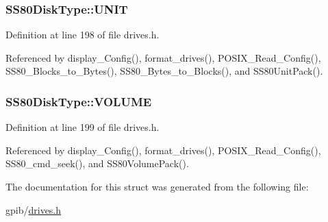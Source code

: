 \subsubsection[{\texorpdfstring{U\+N\+IT}{UNIT}}]{ S\+S80\+Disk\+Type\+::\+U\+N\+IT}\hypertarget{structSS80DiskType_ac630da1440afd60d726c7c41eb7b990c}{}\label{structSS80DiskType_ac630da1440afd60d726c7c41eb7b990c}


Definition at line 198 of file drives.\+h.



Referenced by display\+\_\+\+Config(), format\+\_\+drives(), P\+O\+S\+I\+X\+\_\+\+Read\+\_\+\+Config(), S\+S80\+\_\+\+Blocks\+\_\+to\+\_\+\+Bytes(), S\+S80\+\_\+\+Bytes\+\_\+to\+\_\+\+Blocks(), and S\+S80\+Unit\+Pack().

\subsubsection[{\texorpdfstring{V\+O\+L\+U\+ME}{VOLUME}}]{ S\+S80\+Disk\+Type\+::\+V\+O\+L\+U\+ME}\hypertarget{structSS80DiskType_adef69576dbc48a5d70ff628578d77b60}{}\label{structSS80DiskType_adef69576dbc48a5d70ff628578d77b60}


Definition at line 199 of file drives.\+h.



Referenced by display\+\_\+\+Config(), format\+\_\+drives(), P\+O\+S\+I\+X\+\_\+\+Read\+\_\+\+Config(), S\+S80\+\_\+cmd\+\_\+seek(), and S\+S80\+Volume\+Pack().



The documentation for this struct was generated from the following file\+:\begin{DoxyCompactItemize}
\item 
gpib/\hyperlink{drives_8h}{drives.\+h}\end{DoxyCompactItemize}

